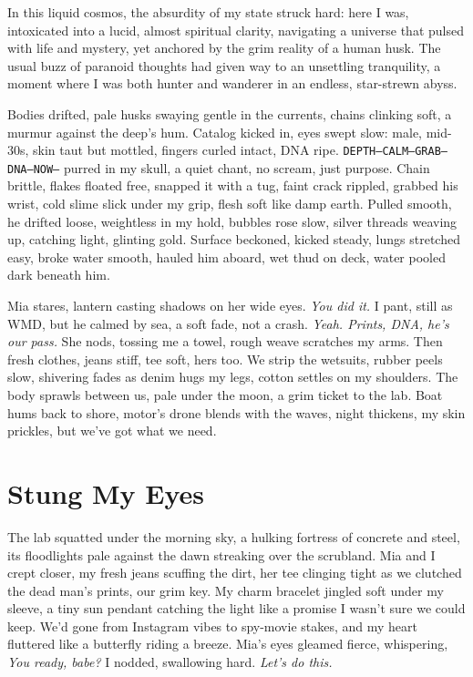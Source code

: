 \documentclass[12pt,oneside]{book} %
\newcommand{\note}[1]{\texttt{#1}}
\begin{document}
In this liquid cosmos, the absurdity of my state struck hard: here I was, intoxicated into a lucid, almost spiritual clarity, navigating a universe that pulsed with life and mystery, yet anchored by the grim reality of a human husk. The usual buzz of paranoid thoughts had given way to an unsettling tranquility, a moment where I was both hunter and wanderer in an endless, star-strewn abyss.

Bodies drifted, pale husks swaying gentle in the currents, chains clinking soft, a murmur against the deep’s hum. Catalog kicked in, eyes swept slow: male, mid-30s, skin taut but mottled, fingers curled intact, DNA ripe. \note{DEPTH—CALM—GRAB—DNA—NOW—} purred in my skull, a quiet chant, no scream, just purpose. Chain brittle, flakes floated free, snapped it with a tug, faint crack rippled, grabbed his wrist, cold slime slick under my grip, flesh soft like damp earth. Pulled smooth, he drifted loose, weightless in my hold, bubbles rose slow, silver threads weaving up, catching light, glinting gold. Surface beckoned, kicked steady, lungs stretched easy, broke water smooth, hauled him aboard, wet thud on deck, water pooled dark beneath him.

Mia stares, lantern casting shadows on her wide eyes. \textit{You did it.} I pant, still as WMD, but he calmed by sea, a soft fade, not a crash. \textit{Yeah. Prints, DNA, he’s our pass.} She nods, tossing me a towel, rough weave scratches my arms. Then fresh clothes, jeans stiff, tee soft, hers too. We strip the wetsuits, rubber peels slow, shivering fades as denim hugs my legs, cotton settles on my shoulders. The body sprawls between us, pale under the moon, a grim ticket to the lab. Boat hums back to shore, motor’s drone blends with the waves, night thickens, my skin prickles, but we’ve got what we need.

\chapter{Stung My Eyes}

The lab squatted under the morning sky, a hulking fortress of concrete and steel, its floodlights pale against the dawn streaking over the scrubland. Mia and I crept closer, my fresh jeans scuffing the dirt, her tee clinging tight as we clutched the dead man’s prints, our grim key. My charm bracelet jingled soft under my sleeve, a tiny sun pendant catching the light like a promise I wasn’t sure we could keep. We’d gone from Instagram vibes to spy-movie stakes, and my heart fluttered like a butterfly riding a breeze. Mia’s eyes gleamed fierce, whispering, \textit{You ready, babe?} I nodded, swallowing hard. \textit{Let’s do this.}
\end{document}
